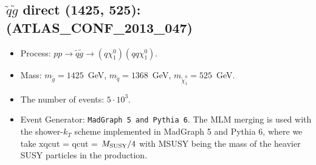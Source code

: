 \documentclass[12pt]{article}
\begin{document}
    
\subsection{$\tilde q \tilde g$ direct (1425, 525): (ATLAS\_CONF\_2013\_047)} 


        \begin{itemize}
        \item  Process: $pp \to \tilde q \tilde g \to (q \chi_1^0)(q q \chi_1^0)$.
        \item  Mass: $m_{\tilde g} = 1425$~GeV, $m_{\tilde q} = 1368$~GeV, $m_{\tilde \chi_1^0} = 525$~GeV.
        \item  The number of events: $5 \cdot 10^3$.
        \item  Event Generator: {\tt MadGraph 5 and Pythia 6}.
                The MLM merging is used with the shower-$k_T$ scheme implemented in MadGraph 5 and Pythia 6, where we take xqcut = qcut = $M_{\rm SUSY}/4$ with MSUSY being the mass of the heavier SUSY particles in the production.      
        \end{itemize}    
    
\end{document}
